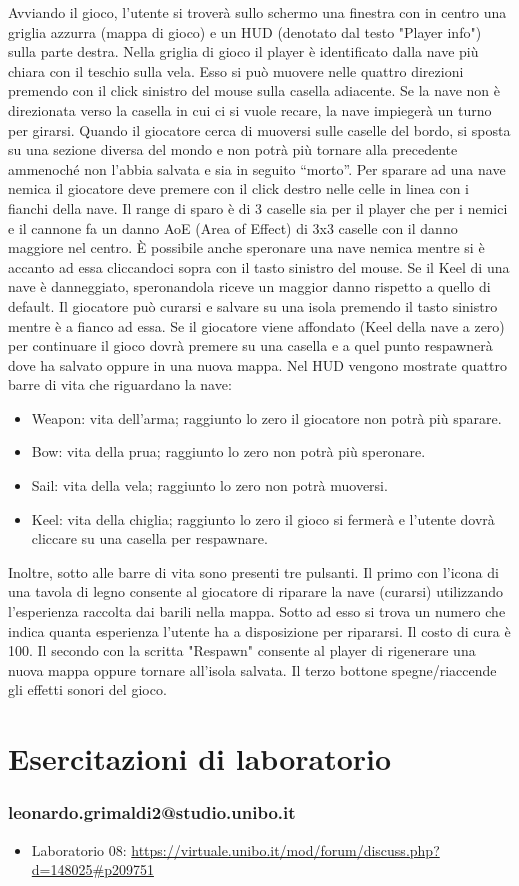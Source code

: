 \documentclass[a4paper,12pt]{report}
\begin{document}
Avviando il gioco, l'utente si troverà sullo schermo una finestra con in centro una griglia azzurra (mappa di gioco) e un HUD (denotato dal testo "Player info") sulla parte destra.
%
Nella griglia di gioco il player è identificato dalla nave più chiara con il teschio sulla vela.
%
Esso si può muovere nelle quattro direzioni premendo con il click sinistro del mouse sulla casella adiacente.
%
Se la nave non è direzionata verso la casella in cui ci si vuole recare, la nave impiegerà un turno per girarsi.
%
Quando il giocatore cerca di muoversi sulle caselle del bordo, si sposta su una sezione diversa del mondo e non potrà più tornare alla precedente ammenoché non l'abbia salvata e sia in seguito ``morto''.
%
Per sparare ad una nave nemica il giocatore deve premere con il click destro nelle celle in linea con i fianchi della nave.
%
Il range di sparo è di 3 caselle sia per il player che per i nemici e il cannone fa un danno AoE (Area of Effect) di 3x3 caselle con il danno maggiore nel centro.
%
È possibile anche speronare una nave nemica mentre si è accanto ad essa cliccandoci sopra con il tasto sinistro del mouse.
%
Se il Keel di una nave è danneggiato, speronandola riceve un maggior danno rispetto a quello di default.
%
Il giocatore può curarsi e salvare su una isola premendo il tasto sinistro mentre è a fianco ad essa.
%
Se il giocatore viene affondato (Keel della nave a zero) per continuare il gioco dovrà premere su una casella e a quel punto respawnerà dove ha salvato oppure in una nuova mappa.
%
\newline
Nel HUD vengono mostrate quattro barre di vita che riguardano la nave:
\begin{itemize}
	\item Weapon: vita dell'arma; raggiunto lo zero il giocatore non potrà più sparare.
	\item Bow: vita della prua; raggiunto lo zero non potrà più speronare.
	\item Sail: vita della vela; raggiunto lo zero non potrà muoversi.
	\item Keel: vita della chiglia; raggiunto lo zero il gioco si fermerà e l'utente dovrà cliccare su una casella per respawnare.
\end{itemize}
Inoltre, sotto alle barre di vita sono presenti tre pulsanti.
%
Il primo con l'icona di una tavola di legno consente al giocatore di riparare la nave (curarsi) utilizzando l'esperienza raccolta dai barili nella mappa.
%
Sotto ad esso si trova un numero che indica quanta esperienza l'utente ha a disposizione per ripararsi. Il costo di cura è 100.
%
Il secondo con la scritta "Respawn" consente al player di rigenerare una nuova mappa oppure tornare all'isola salvata.
%
Il terzo bottone spegne/riaccende gli effetti sonori del gioco.

\chapter{Esercitazioni di laboratorio}
\subsection{leonardo.grimaldi2@studio.unibo.it}

\begin{itemize}
 \item Laboratorio 08: \url{https://virtuale.unibo.it/mod/forum/discuss.php?d=148025#p209751}
\end{itemize}



\end{document}

